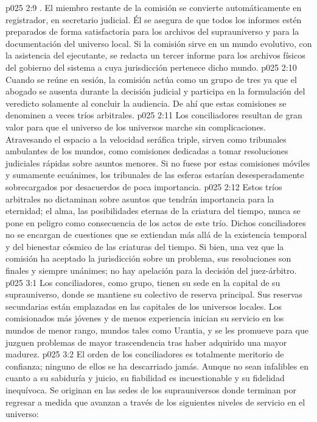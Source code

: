 \vs p025 2:9 . El miembro restante de la comisión se convierte automáticamente en registrador, en secretario judicial. Él se asegura de que todos los informes estén preparados de forma satisfactoria para los archivos del suprauniverso y para la documentación del universo local. Si la comisión sirve en un mundo evolutivo, con la asistencia del ejecutante, se redacta un tercer informe para los archivos físicos del gobierno del sistema a cuya jurisdicción pertenece dicho mundo.
\vs p025 2:10 \pc Cuando se reúne en sesión, la comisión actúa como un grupo de tres ya que el abogado se ausenta durante la decisión judicial y participa en la formulación del veredicto solamente al concluir la audiencia. De ahí que estas comisiones se denominen a veces tríos arbitrales.
\vs p025 2:11 \pc Los conciliadores resultan de gran valor para que el universo de los universos marche sin complicaciones. Atravesando el espacio a la velocidad seráfica triple, sirven como tribunales ambulantes de los mundos, como comisiones dedicadas a tomar resoluciones judiciales rápidas sobre asuntos menores. Si no fuese por estas comisiones móviles y sumamente ecuánimes, los tribunales de las esferas estarían desesperadamente sobrecargados por desacuerdos de poca importancia.
\vs p025 2:12 Estos tríos arbitrales no dictaminan sobre asuntos que tendrán importancia para la eternidad; el alma, las posibilidades eternas de la criatura del tiempo, nunca se pone en peligro como consecuencia de los actos de este trío. Dichos conciliadores no se encargan de cuestiones que se extiendan más allá de la existencia temporal y del bienestar cósmico de las criaturas del tiempo. Si bien, una vez que la comisión ha aceptado la jurisdicción sobre un problema, sus resoluciones son finales y siempre unánimes; no hay apelación para la decisión del juez\hyp{}árbitro.
\vs p025 3:1 Los conciliadores, como grupo, tienen su sede en la capital de su suprauniverso, donde se mantiene su colectivo de reserva principal. Sus reservas secundarias están emplazadas en las capitales de los universos locales. Los comisionados más jóvenes y de menos experiencia inician su servicio en los mundos de menor rango, mundos tales como Urantia, y se les promueve para que juzguen problemas de mayor trascendencia tras haber adquirido una mayor madurez.
\vs p025 3:2 El orden de los conciliadores es totalmente meritorio de confianza; ninguno de ellos se ha descarriado jamás. Aunque no sean infalibles en cuanto a su sabiduría y juicio, su fiabilidad es incuestionable y su fidelidad inequívoca. Se originan en las sedes de los suprauniversos donde terminan por regresar a medida que avanzan a través de los siguientes niveles de servicio en el universo:
